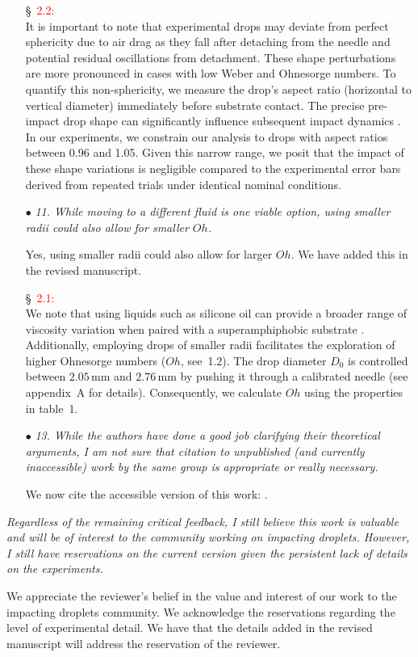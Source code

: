 \documentclass[]{article}
\newcommand*\red{\textcolor{red}}
\newcommand{\oo}{\color{magenta} \normalfont}
\newcommand{\bb}{\color{black} \normalfont}
\begin{document}
\begin{enumerate}
	\S~\red{2.2:}\\
	\oo
	It is important to note that experimental drops may deviate from perfect sphericity due to air drag as they fall after detaching from the needle and potential residual oscillations from detachment. These shape perturbations are more pronounced in cases with low Weber and Ohnesorge numbers. To quantify this non-sphericity, we measure the drop's aspect ratio (horizontal to vertical diameter) immediately before substrate contact. The precise pre-impact drop shape can significantly influence subsequent impact dynamics \citep{thoraval-2013-jfm, yun2017bouncing,Zhang2019}. In our experiments, we constrain our analysis to drops with aspect ratios between 0.96 and 1.05. Given this narrow range, we posit that the impact of these shape variations is negligible compared to the experimental error bars derived from repeated trials under identical nominal conditions.
	\bb
	
	\item[$\bullet$] \textit{11. While moving to a different fluid is one viable option, using smaller radii could also allow for smaller $Oh$.}
	
	Yes, using smaller radii could also allow for larger $Oh$. We have added this in the revised manuscript. 
	
	\S~\red{2.1:}\\
	\oo 
	We note that using liquids such as silicone oil can provide a broader range of viscosity variation when paired with a superamphiphobic substrate \citep{deng2012candle}. Additionally, employing drops of smaller radii facilitates the exploration of higher Ohnesorge numbers ($Oh$, see~1.2). 
	The drop diameter $D_0$ is controlled between $2.05\,\si{\milli\meter}$ and $2.76\,\si{\milli\meter}$ by pushing it through a calibrated needle (see appendix~A for details). 
	Consequently, we calculate $Oh$ using the properties in table~1.\bb
	
	\item[$\bullet$] \textit{13. While the authors have done a good job clarifying their theoretical arguments, I am not sure that citation to unpublished (and currently inaccessible) work by the same group is appropriate or really necessary.}
	
	We now cite the accessible version of this work: \citet{sanjay2024PRL}.
	
\end{enumerate}

\textit{Regardless of the remaining critical feedback, I still believe this work is valuable and will be of interest to the community working on impacting droplets. However, I still have reservations on the current version given the persistent lack of details on the experiments.}

We appreciate the reviewer's belief in the value and interest of our work to the impacting droplets community. We acknowledge the reservations regarding the level of experimental detail. We have that the details added in the revised manuscript will address the reservation of the reviewer. 
	
\printbibliography[title=References]
\end{document}
